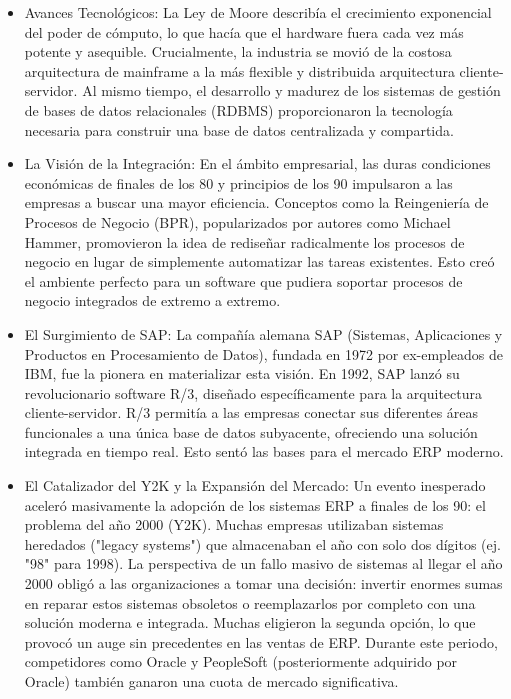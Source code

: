 \documentclass[12pt,letterpaper,spanish]{report}
\begin{document}
\begin{itemize}
  \item Avances Tecnológicos: La Ley de Moore describía el crecimiento exponencial del poder de cómputo, lo que hacía que el hardware fuera cada vez más potente y asequible. Crucialmente, la industria se movió de la costosa arquitectura de mainframe a la más flexible y distribuida arquitectura cliente-servidor. Al mismo tiempo, el desarrollo y madurez de los sistemas de gestión de bases de datos relacionales (RDBMS) proporcionaron la tecnología necesaria para construir una base de datos centralizada y compartida.
  \item La Visión de la Integración: En el ámbito empresarial, las duras condiciones económicas de finales de los 80 y principios de los 90 impulsaron a las empresas a buscar una mayor eficiencia. Conceptos como la Reingeniería de Procesos de Negocio (BPR), popularizados por autores como Michael Hammer, promovieron la idea de rediseñar radicalmente los procesos de negocio en lugar de simplemente automatizar las tareas existentes. Esto creó el ambiente perfecto para un software que pudiera soportar procesos de negocio integrados de extremo a extremo.
  \item El Surgimiento de SAP: La compañía alemana SAP (Sistemas, Aplicaciones y Productos en Procesamiento de Datos), fundada en 1972 por ex-empleados de IBM, fue la pionera en materializar esta visión. En 1992, SAP lanzó su revolucionario software R/3, diseñado específicamente para la arquitectura cliente-servidor. R/3 permitía a las empresas conectar sus diferentes áreas funcionales a una única base de datos subyacente, ofreciendo una solución integrada en tiempo real. Esto sentó las bases para el mercado ERP moderno.
  \item El Catalizador del Y2K y la Expansión del Mercado:
Un evento inesperado aceleró masivamente la adopción de los sistemas ERP a finales de los 90: el problema del año 2000 (Y2K). Muchas empresas utilizaban sistemas heredados ("legacy systems") que almacenaban el año con solo dos dígitos (ej. "98" para 1998). La perspectiva de un fallo masivo de sistemas al llegar el año 2000 obligó a las organizaciones a tomar una decisión: invertir enormes sumas en reparar estos sistemas obsoletos o reemplazarlos por completo con una solución moderna e integrada. Muchas eligieron la segunda opción, lo que provocó un auge sin precedentes en las ventas de ERP. Durante este periodo, competidores como Oracle y PeopleSoft (posteriormente adquirido por Oracle) también ganaron una cuota de mercado significativa.
\end{itemize}
\end{document}
